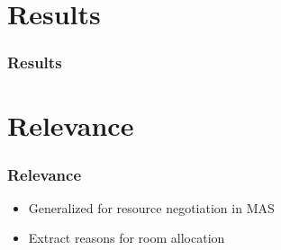 \documentclass{beamer}
\begin{document}
\section{Results}
\begin{frame}
	\frametitle{Results}
\end{frame}

\section{Relevance}
\begin{frame}
	\frametitle{Relevance}
        \begin{itemize}[<+->]
            \item Generalized for resource negotiation in MAS
            \item Extract reasons for room allocation
        \end{itemize}
\end{frame}

\end{document}
